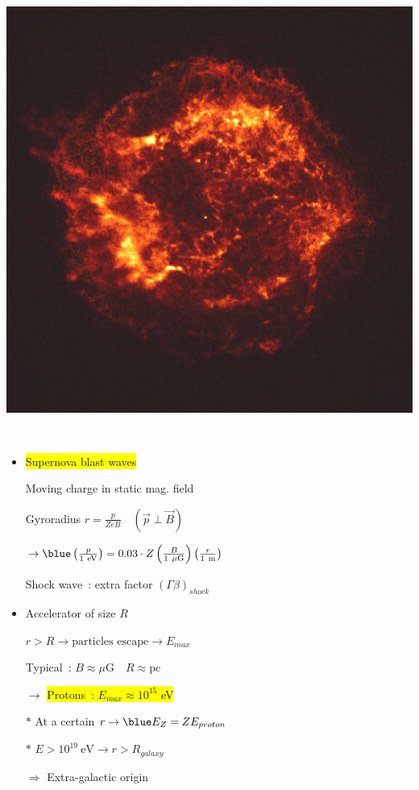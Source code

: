 \Tr
\begin{center}
\includegraphics[keepaspectratio,height=15cm]{Cas_A}
\end{center}

\Tr
{}%
\begin{itemize}
\item \colorbox{yellow}{Supernova blast waves}
\item[] Moving charge in static mag. field
\item[] Gyroradius $r=\frac{p}{ZeB} \quad (\vec{p} \perp \vec{B})$
\item[] $\rightarrow
         {\blue \left(\frac{p}{1~\rm{eV}}\right)=0.03 \cdot Z \left(\frac{B}{1~\mu\rm{G}}\right)
         \left(\frac{r}{1~\rm{m}}\right)}$
\item[] Shock wave~: extra factor $(\Gamma\beta)_{shock}$
\item Accelerator of size $R$
\item[] $r > R \rightarrow \text{particles~escape} \rightarrow E_{max}$
\item[] Typical~: $B \approx \mu\text{G} \quad R \approx \text{pc}$
\item[] $\rightarrow$ \colorbox{yellow}{Protons~: $E_{max} \approx 10^{15}$ eV}
\item[$\ast$] At a certain $r \rightarrow {\blue E_{Z}=Z E_{proton}}$
\item[$\ast$] $E>10^{19}~\text{eV} \rightarrow r>R_{galaxy}$
\item[] $\Rightarrow$ Extra-galactic origin
\end{itemize}

